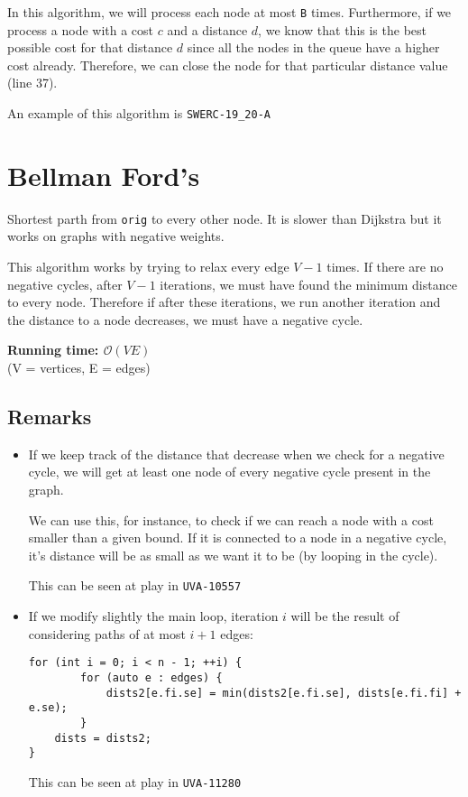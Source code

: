 \documentclass[12pt]{report}
\begin{document}
In this algorithm, we will process each node at most \texttt{B} times. Furthermore, 
if we process a node with a cost $c$ and a distance $d$, we know that this is the 
best possible cost for that distance $d$ since all the nodes in the queue have a higher
cost already. Therefore, we can close the node for that particular distance value (line 37).

An example of this algorithm is \texttt{SWERC-19\_20-A}


\section{Bellman Ford's}
Shortest parth from \texttt{orig} to every other node. It is slower than Dijkstra but 
it works on graphs with negative weights. 

This algorithm works by trying to relax every edge $V-1$ times. If there are no 
negative cycles, after $V-1$ iterations, we must have found the minimum distance
to every node. Therefore if after these iterations, we run another
iteration and the distance to a node decreases, we must have a negative cycle.

\noindent \textbf{\boldmath Running time: $\mathcal{O}(VE)$}
\\ {\small(V = vertices, E = edges)}
\subsection*{Remarks}
\begin{itemize}
	\item If we keep track of the distance that decrease when we check for
		a negative cycle, we will get at least one node of 
		every negative cycle present in the graph.

		We can use this, for instance, to check if we can reach a node with 
		a cost smaller than a given bound. If it is connected to a node in a 
		negative cycle, it's distance will be as small as we want it to be
		(by looping in the cycle).

		This can be seen at play in \texttt{UVA-10557}
		\newpage
	\item If we modify slightly the main loop, iteration $i$ will be the 
		result of considering paths of at most $i+1$ edges:
		\begin{verbatim}
for (int i = 0; i < n - 1; ++i) {
        for (auto e : edges) {
            dists2[e.fi.se] = min(dists2[e.fi.se], dists[e.fi.fi] + e.se);
        }
	dists = dists2;
}
		\end{verbatim}
		This can be seen at play in \texttt{UVA-11280}
		

\end{itemize}	
\end{document}
